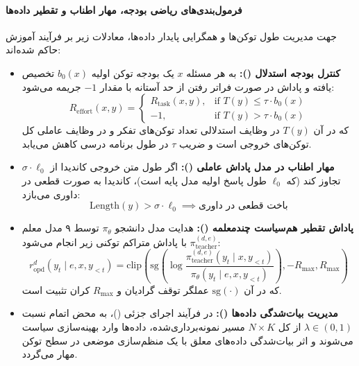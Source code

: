 \paragraph*{فرمول‌بندی‌های ریاضی بودجه، مهار اطناب و تقطیر داده‌ها}
جهت مدیریت طول توکن‌ها و همگرایی پایدار داده‌ها، معادلات زیر بر فرآیند آموزش حاکم شده‌اند:
\begin{itemize}
    \item \textbf{کنترل بودجه استدلال ():} به هر مسئله $x$ یک بودجه توکن اولیه $b_0(x)$ تخصیص یافته و پاداش در صورت فراتر رفتن از حد آستانه با مقدار $-1$ جریمه می‌شود:
    \begin{equation}
        R_{\text{effort}}(x, y) = \begin{cases} 
            R_{\text{task}}(x, y), & \text{if } T(y) \le \tau \cdot b_0(x) \\ 
            -1, & \text{if } T(y) > \tau \cdot b_0(x) 
        \end{cases}
    \end{equation}
    که در آن $T(y)$ در وظایف استدلالی تعداد توکن‌های تفکر و در وظایف عاملی کل توکن‌های خروجی است و ضریب $\tau$ در طول برنامه درسی کاهش می‌یابد.
    \item \textbf{مهار اطناب در مدل پاداش عاملی ():} اگر طول متن خروجی کاندیدا از $\sigma \cdot \ell_0$ تجاوز کند (که $\ell_0$ طول پاسخ اولیه مدل پایه است)، کاندیدا به صورت قطعی در داوری می‌بازد:
    \begin{equation}
        \text{Length}(y) > \sigma \cdot \ell_0 \implies \text{باخت قطعی در داوری}
    \end{equation}
    \item \textbf{پاداش تقطیر هم‌سیاست چندمعلمه ():} هدایت مدل دانشجو $\pi_\theta$ توسط ۹ مدل معلم $\pi_{\text{teacher}}^{(d, e)}$ با پاداش متراکم توکنی زیر انجام می‌شود:
    \begin{equation}
        r_{\text{opd}}^d(y_t \mid e, x, y_{<t}) = \text{clip}\left(\text{sg}\left(\log \frac{\pi_{\text{teacher}}^{(d, e)}(y_t \mid x, y_{<t})}{\pi_\theta(y_t \mid e, x, y_{<t})}\right), -R_{\text{max}}, R_{\text{max}}\right)
    \end{equation}
    که در آن $\text{sg}(\cdot)$ عملگر توقف گرادیان و $R_{\text{max}}$ کران تثبیت است.
    \item \textbf{مدیریت بیات‌شدگی داده‌ها ():} در فرآیند اجرای جزئی ()، به محض اتمام نسبت $\lambda \in (0, 1)$ از کل $N \times K$ مسیر نمونه‌برداری‌شده، داده‌ها وارد بهینه‌سازی سیاست می‌شوند و اثر بیات‌شدگی داده‌های معلق با یک منظم‌سازی موضعی در سطح توکن مهار می‌گردد.
\end{itemize}

